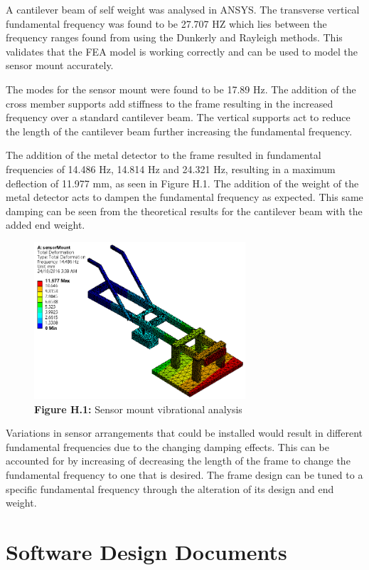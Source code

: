 \documentclass[main.tex]{subfiles}
\begin{document}
\begin{appendices}
A cantilever beam of self weight was analysed in ANSYS. The transverse vertical fundamental frequency was found to be 27.707 HZ which lies between the frequency ranges found from using the Dunkerly and Rayleigh methods. This validates that the FEA model is working correctly and can be used to model the sensor mount accurately.

The modes for the sensor mount were found to be 17.89 Hz. The addition of the cross member supports add stiffness to the frame resulting in the increased frequency over a standard cantilever beam. The vertical supports act to reduce the length of the cantilever beam further increasing the fundamental frequency.

The addition of the metal detector to the frame resulted in fundamental frequencies of 14.486 Hz, 14.814 Hz and 24.321 Hz, resulting in a maximum deflection of 11.977 mm, as seen in Figure H.1. The addition of the weight of the metal detector acts to dampen the fundamental frequency as expected. This same damping can be seen from the theoretical results for the cantilever beam with the added end weight.

\begin{figure}[ht]
\includegraphics[width=0.7\textwidth]{4-DetailedDesign/vibrations.PNG}
\centering
\caption*{\textbf{Figure H.1:} Sensor mount vibrational analysis}
\end{figure} 

Variations in sensor arrangements that could be installed would result in different fundamental frequencies due to the changing damping effects. This can be accounted for by increasing of decreasing the length of the frame to change the fundamental frequency to one that is desired. The frame design can be tuned to a specific fundamental frequency through the alteration of its design and end weight.   


\chapter{Software Design Documents}



\end{appendices}
\end{document}
